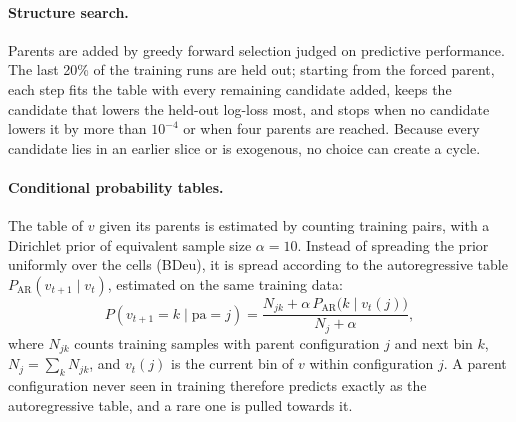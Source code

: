 \paragraph{Structure search.}
Parents are added by greedy forward selection judged on predictive performance.
The last 20\% of the training runs are held out; starting from the forced parent, each step fits the table with every remaining candidate added, keeps the candidate that lowers the held-out log-loss most, and stops when no candidate lowers it by more than $10^{-4}$ or when four parents are reached.
Because every candidate lies in an earlier slice or is exogenous, no choice can create a cycle.

\paragraph{Conditional probability tables.}
The table of $v$ given its parents is estimated by counting training pairs, with a Dirichlet prior of equivalent sample size $\alpha = 10$.
Instead of spreading the prior uniformly over the cells (BDeu), it is spread according to the autoregressive table $P_{\mathrm{AR}}(v_{t+1} \mid v_t)$, estimated on the same training data:
\begin{equation}
  P(v_{t+1} = k \mid \mathrm{pa} = j) = \frac{N_{jk} + \alpha\, P_{\mathrm{AR}}\bigl(k \mid v_t(j)\bigr)}{N_j + \alpha},
\end{equation}
where $N_{jk}$ counts training samples with parent configuration $j$ and next bin $k$, $N_j = \sum_k N_{jk}$, and $v_t(j)$ is the current bin of $v$ within configuration $j$.
A parent configuration never seen in training therefore predicts exactly as the autoregressive table, and a rare one is pulled towards it.

